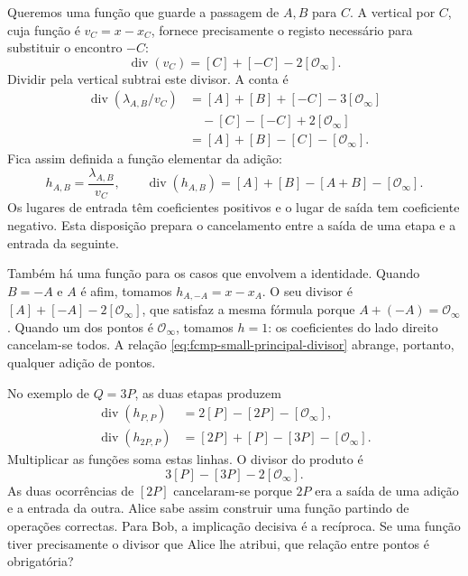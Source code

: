 Queremos uma função que guarde a passagem de \(A,B\) para \(C\).
A vertical por \(C\), cuja função é \(v_C=x-x_C\), fornece
precisamente o registo necessário para substituir o encontro \(-C\):
\[
 \operatorname{div}(v_C)=[C]+[-C]-2[\mathcal O_\infty].
\]
Dividir pela vertical subtrai este divisor. A conta é
\begin{align*}
 \operatorname{div}(\lambda_{A,B}/v_C)
 &=[A]+[B]+[-C]-3[\mathcal O_\infty]\\
 &\quad-[C]-[-C]+2[\mathcal O_\infty]\\
 &=[A]+[B]-[C]-[\mathcal O_\infty].
\end{align*}
Fica assim definida a função elementar da adição:
\begin{equation}
 h_{A,B}=\frac{\lambda_{A,B}}{v_C},\qquad
 \operatorname{div}(h_{A,B})=[A]+[B]-[A+B]-[\mathcal O_\infty].
 \label{eq:fcmp-small-principal-divisor}
\end{equation}
Os lugares de entrada têm coeficientes positivos e o lugar de saída
tem coeficiente negativo. Esta disposição prepara o cancelamento entre
a saída de uma etapa e a entrada da seguinte.

Também há uma função para os casos que envolvem a identidade. Quando
\(B=-A\) e \(A\) é afim, tomamos \(h_{A,-A}=x-x_A\). O seu
divisor é \([A]+[-A]-2[\mathcal O_\infty]\), que satisfaz a mesma
fórmula porque \(A+(-A)=\mathcal O_\infty\). Quando um dos pontos
é \(\mathcal O_\infty\), tomamos \(h=1\): os coeficientes do
lado direito cancelam-se todos. A relação
\eqref{eq:fcmp-small-principal-divisor} abrange, portanto, qualquer
adição de pontos.

No exemplo de \(Q=3P\), as duas etapas produzem
\begin{align*}
 \operatorname{div}(h_{P,P})&=2[P]-[2P]-[\mathcal O_\infty],\\
 \operatorname{div}(h_{2P,P})&=[2P]+[P]-[3P]-[\mathcal O_\infty].
\end{align*}
Multiplicar as funções soma estas linhas. O divisor do produto é
\[
 3[P]-[3P]-2[\mathcal O_\infty].
\]
As duas ocorrências de \([2P]\) cancelaram-se porque \(2P\) era a saída de
uma adição e a entrada da outra. Alice sabe assim construir uma função
partindo de operações correctas. Para Bob, a implicação decisiva é a
recíproca. Se uma função tiver precisamente o divisor que Alice lhe
atribui, que relação entre pontos é obrigatória? \cite{eagen-divisors}

